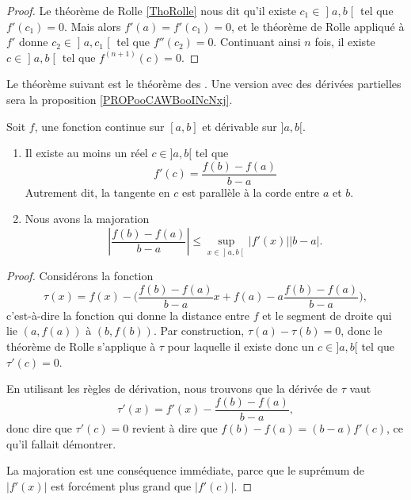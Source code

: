 \begin{proof}
	Le théorème de Rolle \ref{ThoRolle} nous dit qu'il existe \( c_1\in \mathopen] a , b \mathclose[\) tel que \( f'(c_1)=0\). Mais alors \( f'(a)=f'(c_1)=0\), et le théorème de Rolle appliqué à \( f'\) donne \( c_2\in \mathopen] a , c_1 \mathclose[\) tel que \( f''(c_2)=0\). Continuant ainsi \( n\) fois, il existe \( c\in \mathopen] a ,b\mathclose[\) tel que \( f^{(n+1)}(c)=0\).
\end{proof}

Le théorème suivant est le théorème des . Une version avec des dérivées partielles sera la proposition \ref{PROPooCAWBooINcNxj}.
\begin{theorem}       \label{ThoAccFinis}
	Soit \( f\), une fonction continue sur \( [a,b]\) et dérivable sur \( ]a,b[\).
	\begin{enumerate}
		\item       \label{ITEMooFZONooXJqLyX}
		      Il existe au moins un réel \( c\in]a,b[\) tel que
		      \begin{equation}
			      f'(c)=\frac{ f(b)-f(a) }{ b-a }
		      \end{equation}
		      Autrement dit, la tangente en \( c\) est parallèle à la corde entre \( a\) et \( b\).
		\item       \label{ITEMooXRQKooDBFpdQ}
		      Nous avons la majoration
		      \begin{equation}
			      \left| \frac{ f(b)-f(a) }{ b-a } \right| \leq \sup_{x\in\mathopen] a , b \mathclose[}| f'(x) |  | b-a |.
		      \end{equation}
	\end{enumerate}
\end{theorem}

\begin{proof}
	Considérons la fonction
	\begin{equation}
		\tau(x)=f(x)-\Big( \frac{ f(b)-f(a) }{ b-a }x + f(a) - a\frac{ f(b)-f(a) }{ b-a } \Big),
	\end{equation}
	c'est-à-dire la fonction qui donne la distance entre \( f\) et le segment de droite qui lie \( (a,f(a))\) à \( (b,f(b))\). Par construction, \( \tau(a)-\tau(b)=0\), donc le théorème de Rolle s'applique à \( \tau\) pour laquelle il existe donc un \( c\in]a,b[\) tel que \( \tau'(c)=0\).

	En utilisant les règles de dérivation, nous trouvons que la dérivée de \( \tau\) vaut
	\begin{equation}
		\tau'(x)= f'(x)-\frac{ f(b)-f(a) }{ b-a },
	\end{equation}
	donc dire que \( \tau'(c)=0\) revient à dire que \( f(b)-f(a)=(b-a)f'(c)\), ce qu'il fallait démontrer.

	La majoration est une conséquence immédiate, parce que le suprémum de \( | f'(x) |\) est forcément plus grand que \( | f'(c) |\).
\end{proof}


